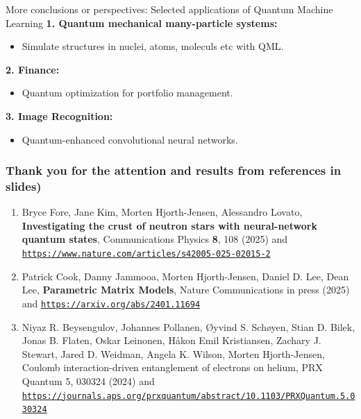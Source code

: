 \documentclass{beamer}
\begin{document}
\begin{frame}{More conclusions or perspectives: Selected applications of Quantum Machine Learning}
\textbf{1. Quantum mechanical many-particle systems:}
\begin{itemize}
    \item Simulate  structures in nuclei, atoms, moleculs etc with QML.
\end{itemize}

\textbf{2. Finance:}
\begin{itemize}
    \item Quantum optimization for portfolio management.
\end{itemize}

\textbf{3. Image Recognition:}
\begin{itemize}
    \item Quantum-enhanced convolutional neural networks.
\end{itemize}
\end{frame}


\begin{frame}
\frametitle{Thank you for the attention and results from references in slides)}
\begin{enumerate}

\item Bryce Fore, Jane Kim, Morten Hjorth-Jensen, Alessandro Lovato, \textbf{Investigating the crust of neutron stars with neural-network quantum states}, Communications Physics \textbf{8}, 108  (2025) and \href{{https://www.nature.com/articles/s42005-025-02015-2}}{\nolinkurl{https://www.nature.com/articles/s42005-025-02015-2}}

\item Patrick Cook, Danny Jammooa, Morten Hjorth-Jensen, Daniel D. Lee, Dean Lee, \textbf{Parametric Matrix Models}, Nature Communications in press (2025)  and \href{{https://arxiv.org/abs/2401.11694}}{\nolinkurl{https://arxiv.org/abs/2401.11694}}

\item Niyaz R. Beysengulov, Johannes Pollanen, Øyvind S. Schøyen, Stian D. Bilek, Jonas B. Flaten, Oskar Leinonen, Håkon Emil Kristiansen, Zachary J. Stewart, Jared D. Weidman, Angela K. Wilson, Morten Hjorth-Jensen, Coulomb interaction-driven entanglement of electrons on helium, PRX Quantum 5, 030324 (2024) and \href{{https://journals.aps.org/prxquantum/abstract/10.1103/PRXQuantum.5.030324}}{\nolinkurl{https://journals.aps.org/prxquantum/abstract/10.1103/PRXQuantum.5.030324}}

\end{enumerate}
\end{frame}
\end{document}
